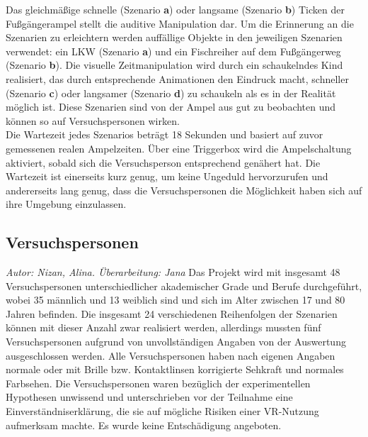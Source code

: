 \documentclass{Paper}
\begin{document}


Das gleichmäßige schnelle (Szenario \textbf{a}) oder langsame (Szenario \textbf{b}) Ticken der Fußgängerampel stellt die auditive Manipulation dar. Um die Erinnerung an die Szenarien zu erleichtern werden auffällige Objekte in den jeweiligen Szenarien verwendet: ein LKW (Szenario \textbf{a}) und ein Fischreiher auf dem Fußgängerweg (Szenario \textbf{b}).
Die visuelle Zeitmanipulation wird durch ein schaukelndes Kind realisiert, das durch entsprechende Animationen den Eindruck macht, schneller (Szenario \textbf{c}) oder langsamer (Szenario \textbf{d}) zu schaukeln als es in der Realität möglich ist. Diese Szenarien sind von der Ampel aus gut zu beobachten und können so auf Versuchspersonen wirken.\\
Die Wartezeit jedes Szenarios beträgt 18 Sekunden und basiert auf zuvor gemessenen realen Ampelzeiten. Über eine Triggerbox wird die Ampelschaltung aktiviert, sobald sich die Versuchsperson entsprechend genähert hat. Die Wartezeit ist einerseits kurz genug, um keine Ungeduld hervorzurufen und andererseits lang genug, dass die Versuchspersonen die Möglichkeit haben sich auf ihre Umgebung einzulassen. 

\subsection{Versuchspersonen}
        \textit{Autor: Nizan, Alina. Überarbeitung: Jana}
Das Projekt wird mit insgesamt 48 Versuchspersonen unterschiedlicher akademischer Grade und Berufe  durchgeführt, wobei 35 männlich und 13 weiblich sind und sich im Alter zwischen 17 und 80 Jahren befinden. 
Die insgesamt 24 verschiedenen Reihenfolgen der Szenarien können mit dieser Anzahl zwar realisiert werden, allerdings mussten fünf Versuchspersonen aufgrund von unvollständigen Angaben von der Auswertung ausgeschlossen werden. 
Alle Versuchspersonen haben nach eigenen Angaben normale oder mit Brille bzw. Kontaktlinsen korrigierte Sehkraft und normales Farbsehen. Die Versuchspersonen waren bezüglich der experimentellen Hypothesen unwissend und unterschrieben vor der Teilnahme eine Einverständniserklärung, die sie auf mögliche Risiken einer VR-Nutzung aufmerksam machte. Es wurde keine Entschädigung angeboten. 
\end{document}
